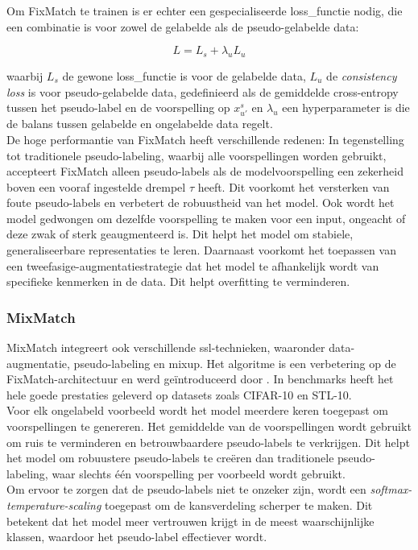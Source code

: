 Om FixMatch te trainen is er echter een gespecialiseerde \gls{loss_functie} nodig, die een combinatie is voor zowel de gelabelde als de pseudo-gelabelde data:

$$
L = L_s + \lambda_u L_u
$$

waarbij $L_s$ de gewone \gls{loss_functie} is voor de gelabelde data, $L_u$ de \emph{consistency loss} is voor pseudo-gelabelde data, gedefinieerd als de gemiddelde cross-entropy tussen het pseudo-label en de voorspelling op $x_{u'}^s$ en $\lambda_u$ een hyperparameter is die de balans tussen gelabelde en ongelabelde data regelt. \\

De hoge performantie van FixMatch heeft verschillende redenen: In tegenstelling tot traditionele pseudo-labeling, waarbij alle voorspellingen worden gebruikt, accepteert FixMatch alleen pseudo-labels als de modelvoorspelling een zekerheid boven een vooraf ingestelde drempel $\tau$ heeft. Dit voorkomt het versterken van foute pseudo-labels en verbetert de robuustheid van het model. Ook wordt het model gedwongen om dezelfde voorspelling te maken voor een input, ongeacht of deze zwak of sterk geaugmenteerd is. Dit helpt het model om stabiele, generaliseerbare representaties te leren. Daarnaast voorkomt het toepassen van een tweefasige-augmentatiestrategie dat het model te afhankelijk wordt van specifieke kenmerken in de data. Dit helpt overfitting te verminderen.

\subsubsection{MixMatch}

MixMatch integreert ook verschillende \gls{ssl}-technieken, waaronder data-augmentatie, pseudo-labeling en mixup. Het algoritme is een verbetering op de FixMatch-architectuur en werd geïntroduceerd door \textcite{Berthelot_2019}. In benchmarks heeft het hele goede prestaties geleverd op datasets zoals CIFAR-10 en STL-10. \\

Voor elk ongelabeld voorbeeld wordt het model meerdere keren toegepast om voorspellingen te genereren. Het gemiddelde van de voorspellingen wordt gebruikt om ruis te verminderen en betrouwbaardere pseudo-labels te verkrijgen. Dit helpt het model om robuustere pseudo-labels te creëren dan traditionele pseudo-labeling, waar slechts één voorspelling per voorbeeld wordt gebruikt. \\

Om ervoor te zorgen dat de pseudo-labels niet te onzeker zijn, wordt een \emph{softmax-temperature-scaling} toegepast om de kansverdeling scherper te maken. Dit betekent dat het model meer vertrouwen krijgt in de meest waarschijnlijke klassen, waardoor het pseudo-label effectiever wordt.

